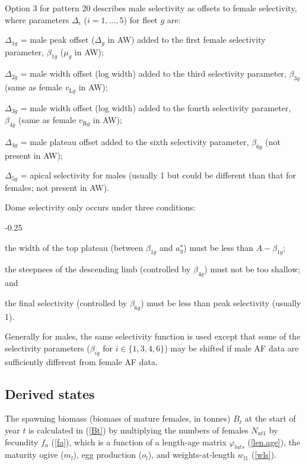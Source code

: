 \documentclass[11pt]{book}
\newcommand{\eref}[1]{(\ref{#1})}
\begin{document}
Option 3 for pattern 20 describes male selectivity as offsets to female selectivity, where parameters $\Delta_i$ ($i=1,...,5$) for fleet $g$ are:
\begin{enumerate_csas}{}{}
\item $\Delta_{1g}$ = male peak offset ($\Delta_g$ in AW) added to the first female selectivity parameter, $\beta_{1g}$ ($\mu_g$ in AW);
\item $\Delta_{2g}$ = male width offset (log width) added to the third selectivity parameter, $\beta_{3g}$ (same as female $v_{\text{L}g}$ in AW);
\item $\Delta_{3g}$ = male width offset (log width) added to the fourth selectivity parameter, $\beta_{4g}$ (same as female $v_{\text{R}g}$ in AW);
\item $\Delta_{4g}$ = male plateau offset added to the sixth selectivity parameter, $\beta_{6g}$ (not present in AW);
\item $\Delta_{5g}$ = apical selectivity for males (usually 1 but could be different than that for females; not present in AW).
\end{enumerate_csas}

Dome selectivity only occurs under three conditions:\\
\begin{itemize_csas}{-0.25}{}
  \item the width of the top plateau (between $\beta_{1g}$ and $a_g^{\star}$) must be less than $A - \beta_{1g}$;
  \item the steepnees of the descending limb (controlled by $\beta_{4g}$) must not be too shallow; and 
  \item the final selectivity (controlled by $\beta_{6g}$) must be less than peak selectivity (usually 1).
\end{itemize_csas}
Generally for males, the same selectivity function is used except that some of the selectivity parameters ($\beta_{ig}$ for $i\in \{1,3,4,6\}$) may be shifted if male AF data are sufficiently different from female AF data.

\subsection{Derived states}

The spawning biomass (biomass of mature females, in tonnes) $B_t$ at the start of year $t$ is calculated in \eref{Bt} by multiplying the numbers of females $N_{at1}$ by fecundity $f_a$ \eref{fa}, which is a function of a length-age matrix $\varphi_{lats}$ \eref{len.age}, the maturity ogive ($m_l$), egg production ($o_l$), and weights-at-length $w_{l1}$ \eref{wls}.
\end{document}
